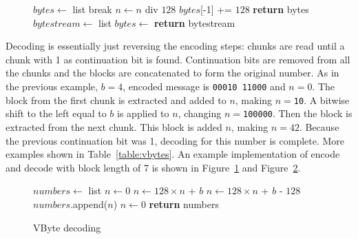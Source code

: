 \begin{figure}[ht]
\centering
  \begin{minipage}{0.5\linewidth}
\begin{algorithmic}[H]
\State $bytes\gets $ list
\State {}
 \State break \EndIf
\State $n\gets n$ div $128$
\EndWhile
\State $bytes$[-1] += $128$
\State \textbf{return} bytes
\EndFunction
\medskip
\medskip
{}
\State $bytestream\gets $ list
\State $bytes \gets$ 
\State {}
\EndFor
\State \textbf{return} bytestream
\EndFunction

\end{algorithmic}
\end{minipage}
 \label{vbyte_enc}
\end{figure}

Decoding is essentially just reversing the encoding steps: chunks are read until a chunk with 1 as continuation bit is found. Continuation bits 
are removed from all the chunks and the blocks are concatenated to form the original number. As in the previous example, $b = 4$, encoded message 
is \texttt{00010 11000} and $n = 0$. The block from the first chunk is extracted and added to $n$, making $n = $\texttt{10}. A bitwise shift to the left 
equal to $b$ is applied to $n$, changing $n = $\texttt{100000}. Then the block is extracted from the next chunk. This block is added  $n$, making 
$n = 42$. Because the previous continuation bit was 1, decoding for this number is complete. More examples shown in Table~\ref{table:vbytes}. 
An example implementation of encode and decode with block length of 7 is shown in Figure~\ref{vbyte_enc} and Figure~\ref{vbyte_dec}.

\begin{figure}[ht]
\centering
  \begin{minipage}{0.5\linewidth}
\begin{algorithmic}[H]
\State $numbers\gets $ list
\State $n\gets 0$
\State $n\gets 128\times n $ + $b$
\Else
\State $n\gets 128\times n $ + $b$ - $128$
\State $numbers$.append($n$)
\State $n\gets 0$
\EndIf
\EndFor
\State \textbf{return} numbers
\EndFunction
\end{algorithmic}
\end{minipage}
\caption{VByte decoding} \label{vbyte_dec}
\end{figure}

